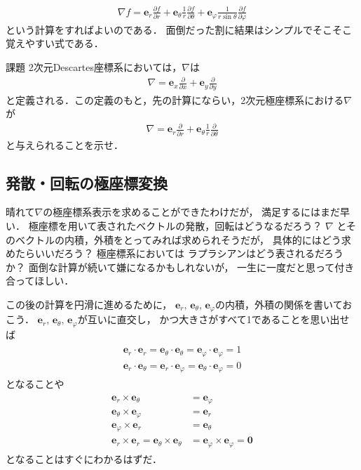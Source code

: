\begin{align}
\nabla f = \bm{e}_r \frac{ \partial f } {\partial r} 
+ \bm{e}_{\theta} \frac{1}{r} \frac{ \partial f } {\partial \theta}
+ \bm{e}_{\varphi} \frac{1}{r \sin \theta } \frac{ \partial f } {\partial \varphi}
\label{eq:nablafkyoku}
\end{align}
という計算をすればよいのである．
面倒だった割に結果はシンプルでそこそこ覚えやすい式である．
\begin{itembox}[l]{課題}
2次元Descartes座標系においては，$\nabla$は
\begin{align}
\nabla = \bm{e}_x \frac{ \partial }{\partial x} + \bm{e} _y \frac{\partial}{\partial y}
\label{eq:nabla2d}
\end{align}
と定義される．この定義のもと，先の計算にならい，2次元極座標系における$\nabla$が
\begin{align}
\nabla = \bm{e}_r \frac{\partial }{\partial r} 
+ \bm{e}_{\theta} \frac{1}{r} \frac{\partial}{\partial \theta}
\label{eq:nabla2dkyoku}
\end{align}
と与えられることを示せ．
\end{itembox}

\subsection{発散・回転の極座標変換}
晴れて$\nabla$の極座標系表示を求めることができたわけだが，
満足するにはまだ早い．
極座標を用いて表されたベクトルの発散，回転はどうなるだろう？ $\nabla$
とそのベクトルの内積，外積をとってみれば求められそうだが，
具体的にはどう求めたらいいだろう？ 極座標系においては
ラプラシアンはどう表されるだろうか？ 面倒な計算が続いて嫌になるかもしれないが，
一生に一度だと思って付き合ってほしい．

この後の計算を円滑に進めるために，
$\bm{e}_r, \, \bm{e}_{\theta}, \, \bm{e}_\varphi$の内積，外積の関係を書いておこう．
$\bm{e}_r, \, \bm{e}_{\theta}, \, \bm{e}_\varphi$が互いに直交し，
かつ大きさがすべて1であることを思い出せば
\begin{align}
\begin{aligned}
\bm{e}_r \cdot \bm{e}_r = \bm{e}_\theta \cdot \bm{e}_\theta 
= \bm{e}_\varphi \cdot \bm{e}_\varphi = 1 \\
\bm{e}_r \cdot \bm{e}_\theta = \bm{e}_r \cdot \bm{e}_\varphi 
= \bm{e}_\theta \cdot \bm{e}_\varphi = 0 
\end{aligned}
\label{eq:kyokukiteinaiseki} 
\end{align}
となることや 
\begin{align}
\begin{aligned}
\bm{e}_r \times \bm{e}_\theta & = \bm{e}_\varphi \\
\bm{e}_\theta \times \bm{e}_\varphi & = \bm{e}_r \\
\bm{e}_\varphi \times \bm{e}_r & = \bm{e}_\theta \\
\bm{e}_r \times \bm{e}_r = \bm{e}_\theta \times \bm{e}_\theta
& = \bm{e}_\varphi \times \bm{e}_\varphi = \bm{0}
\end{aligned}
\label{eq:kyokukiteigaiseki}
\end{align}
となることはすぐにわかるはずだ．

